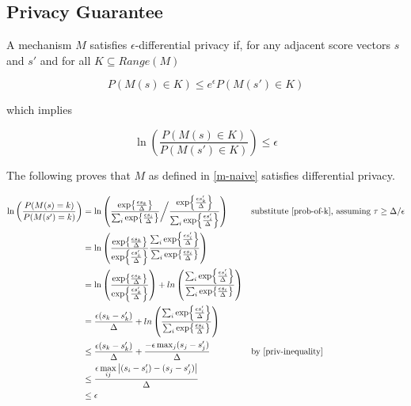 \documentclass{article}
\begin{document}
\subsection{Privacy Guarantee}
\label{privacy-guarantee}
A mechanism $M$ satisfies $\epsilon$-differential privacy if, for any adjacent score vectors $s$ and $s'$ and for all $K \subseteq Range(M)$

\begin{equation}
    P(M(s) \in K) \leq e^\epsilon P(M(s') \in K)
\end{equation}

which implies

\begin{equation}
    \label{ln-defn}
    \ln\left(\frac{P(M(s) \in K)}{P(M(s') \in K)}\right)  \leq \epsilon
\end{equation}

The following proves that $M$ as defined in \ref{m-naive} satisfies differential privacy.

\begin{align*}
    \ln\left(\frac{P(M(s) = k)}{P(M(s') = k)}\right) &= \ln \left(
        \frac
            {\exp{\frac{\epsilon s_k}{\Delta}}}
            {\sum_{i} \exp{\frac{\epsilon s_i}{\Delta}}
        }
        \bigg/ \frac
            {\exp{\frac{\epsilon s'_k}{\Delta}}}
            {\sum_{i} \exp{\frac{\epsilon s'_i}{\Delta}}} \right)
        &&\text{substitute \ref{prob-of-k}, assuming } \tau \geq \Delta / \epsilon \\
    &= \ln \left(\frac
        {\exp{\frac{\epsilon s_k}{\Delta}}}{\exp{\frac{\epsilon s'_k}{\Delta}}}
        \frac{\sum_{i} \exp{\frac{\epsilon s'_i}{\Delta}}}{\sum_{i} \exp{\frac{\epsilon s_i}{\Delta}}}\right) \\
    &= \ln \left(\frac
        {\exp{\frac{\epsilon s_k}{\Delta}}}{\exp{\frac{\epsilon s'_k}{\Delta}}}\right) + ln \left(
        \frac{\sum_{i} \exp{\frac{\epsilon s'_i}{\Delta}}}{\sum_{i} \exp{\frac{\epsilon s_i}{\Delta}}}\right) \\
    &= \frac{\epsilon (s_k - s'_k)}{\Delta} 
        + ln\left(\frac{\sum_{i} \exp{\frac{\epsilon s'_i}{\Delta}}}{\sum_{i} \exp{\frac{\epsilon s_i}{\Delta}}}\right) \\
    &\leq \frac{\epsilon (s_k - s'_k)}{\Delta} + \frac{-\epsilon \max_j (s_j - s'_j)}{\Delta} &&\text{by \ref{priv-inequality}} \\
    &\leq \frac{\epsilon\max\limits_{ij} \abs{(s_i - s'_i) - (s_j - s'_j)}}{\Delta} \\
    &\leq \epsilon
\end{align*}
\end{document}
